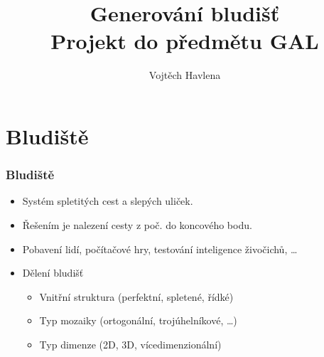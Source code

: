 \documentclass{beamer}
\author{Vojtěch Havlena}
\title{Generování bludišť\\ {\small Projekt do předmětu GAL}}
\institute{Fakulta informačních technologií, VUT}
\begin{document}
  \begin{frame}
    \titlepage
  \end{frame}
  
  \section{Bludiště}
  \begin{frame}
   \frametitle{Bludiště}
   \begin{itemize}
    \setlength\itemsep{1em}
    \item Systém spletitých cest a slepých uliček.
    \item Řešením je nalezení cesty z poč. do koncového bodu.
    \item Pobavení lidí, počítačové hry, testování inteligence živočichů, \dots
    \item Dělení bludišť
    \begin{itemize}
     \item Vnitřní struktura (perfektní, spletené, řídké)
     \item Typ mozaiky (ortogonální, trojúhelníkové, \dots)
     \item Typ dimenze (2D, 3D, vícedimenzionální)
    \end{itemize}
   \end{itemize}
  \end{frame}
  
\end{document}
